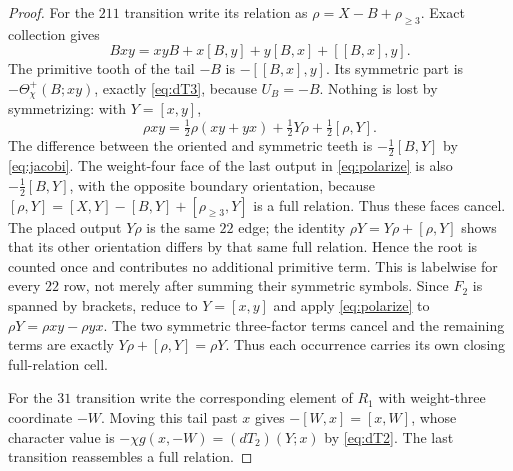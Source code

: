 \documentclass[10pt,a4paper]{amsart}
\theoremstyle{remark}
\begin{document}
\begin{proof}
For the $211$ transition write its relation as
$\rho=X-B+\rho_{\ge3}$.  Exact collection gives
\begin{equation}
 Bxy=xyB+x[B,y]+y[B,x]+[[B,x],y].                       \label{eq:Bxy}
\end{equation}
The primitive tooth of the tail $-B$ is $-[[B,x],y]$.
Its symmetric part is $-\Theta^+_\chi(B;xy)$, exactly
\eqref{eq:dT3}, because
$U_B=-B$.  Nothing is lost by symmetrizing: with $Y=[x,y]$,
\begin{equation}
 \rho xy=\tfrac12\rho(xy+yx)+\tfrac12Y\rho
                              +\tfrac12[\rho,Y].         \label{eq:polarize}
\end{equation}
The difference between the oriented and symmetric teeth is
$-\frac12[B,Y]$ by \eqref{eq:jacobi}.  The weight-four face of the
last output in \eqref{eq:polarize} is also $-\frac12[B,Y]$, with the
opposite boundary orientation,
because
$[\rho,Y]=[X,Y]-[B,Y]+[\rho_{\ge3},Y]$ is a full relation.
Thus these faces cancel.  The placed output $Y\rho$ is the same $22$
edge; the identity $\rho Y=Y\rho+[\rho,Y]$ shows that its other
orientation differs by that same full relation.  Hence the root is
counted once and contributes no additional primitive term.
This is labelwise for every $22$ row, not merely after summing their
symmetric symbols.  Since $F_2$ is spanned by brackets, reduce to
$Y=[x,y]$ and apply \eqref{eq:polarize} to
$\rho Y=\rho xy-\rho yx$.  The two symmetric three-factor terms cancel
and the remaining terms are exactly
$Y\rho+[\rho,Y]=\rho Y$.  Thus each occurrence carries its own closing
full-relation cell.

For the $31$ transition write the corresponding element of $R_1$ with
weight-three coordinate $-W$.  Moving this tail past $x$ gives
$-[W,x]=[x,W]$, whose character value is
$-\chi g(x,-W)=(dT_2)(Y;x)$ by \eqref{eq:dT2}.  The last transition
reassembles a full relation.


\end{proof}
\end{document}
